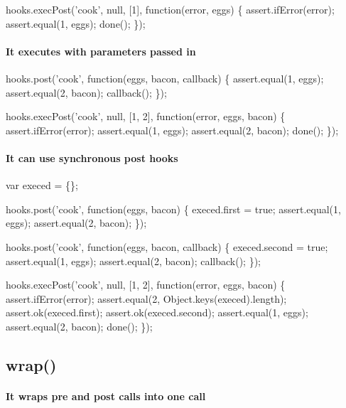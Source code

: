\begin{DoxyCode}
hooks.execPost('cook', null, [1], function(error, eggs) \{
  assert.ifError(error);
  assert.equal(1, eggs);
  done();
\});
\end{DoxyCode}


\paragraph*{It executes with parameters passed in}


\begin{DoxyCode}
hooks.post('cook', function(eggs, bacon, callback) \{
  assert.equal(1, eggs);
  assert.equal(2, bacon);
  callback();
\});

hooks.execPost('cook', null, [1, 2], function(error, eggs, bacon) \{
  assert.ifError(error);
  assert.equal(1, eggs);
  assert.equal(2, bacon);
  done();
\});
\end{DoxyCode}


\paragraph*{It can use synchronous post hooks}


\begin{DoxyCode}
var execed = \{\};

hooks.post('cook', function(eggs, bacon) \{
  execed.first = true;
  assert.equal(1, eggs);
  assert.equal(2, bacon);
\});

hooks.post('cook', function(eggs, bacon, callback) \{
  execed.second = true;
  assert.equal(1, eggs);
  assert.equal(2, bacon);
  callback();
\});

hooks.execPost('cook', null, [1, 2], function(error, eggs, bacon) \{
  assert.ifError(error);
  assert.equal(2, Object.keys(execed).length);
  assert.ok(execed.first);
  assert.ok(execed.second);
  assert.equal(1, eggs);
  assert.equal(2, bacon);
  done();
\});
\end{DoxyCode}


\subsection*{wrap()}

\paragraph*{It wraps pre and post calls into one call}


